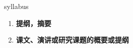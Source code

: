 
\begin{frame}
{\huge syllabus}
\begin{center}
\begin{enumerate}\Large
  \item \textbf{提纲，摘要}
  \item \textbf{课文、演讲或研究课题的概要或提纲}
\end{enumerate}
\end{center}
\end{frame}
